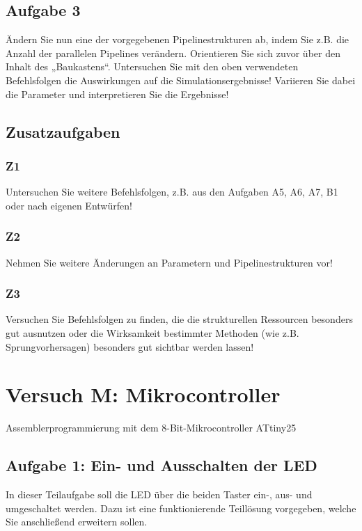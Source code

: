 \documentclass[a4paper,12pt,titlepage]{scrartcl}
\begin{document}
\subsection*{Aufgabe 3}
Ändern Sie nun eine der vorgegebenen Pipelinestrukturen ab, indem Sie z.B. die Anzahl der parallelen Pipelines verändern. Orientieren Sie sich zuvor über den Inhalt des „Baukastens“. Untersuchen Sie mit den oben verwendeten Befehlsfolgen die Auswirkungen auf die Simulationsergebnisse! Variieren Sie dabei die Parameter und interpretieren Sie die Ergebnisse!

\subsection*{Zusatzaufgaben}
\subsubsection*{Z1}
Untersuchen Sie weitere Befehlsfolgen, z.B. aus den Aufgaben A5, A6, A7, B1 oder nach eigenen Entwürfen!

\subsubsection*{Z2}
Nehmen Sie weitere Änderungen an Parametern und Pipelinestrukturen vor!

\subsubsection*{Z3}
Versuchen Sie Befehlsfolgen zu finden, die die strukturellen Ressourcen besonders gut ausnutzen oder die Wirksamkeit bestimmter Methoden (wie z.B. Sprungvorhersagen) besonders gut sichtbar werden lassen!


\section*{Versuch M: Mikrocontroller}
Assemblerprogrammierung mit dem 8-Bit-Mikrocontroller ATtiny25

\subsection*{Aufgabe 1: Ein- und Ausschalten der LED}
In dieser Teilaufgabe soll die LED über die beiden Taster ein-, aus- und umgeschaltet werden. Dazu
ist eine funktionierende Teillösung vorgegeben, welche Sie anschließend erweitern sollen.
\end{document}
